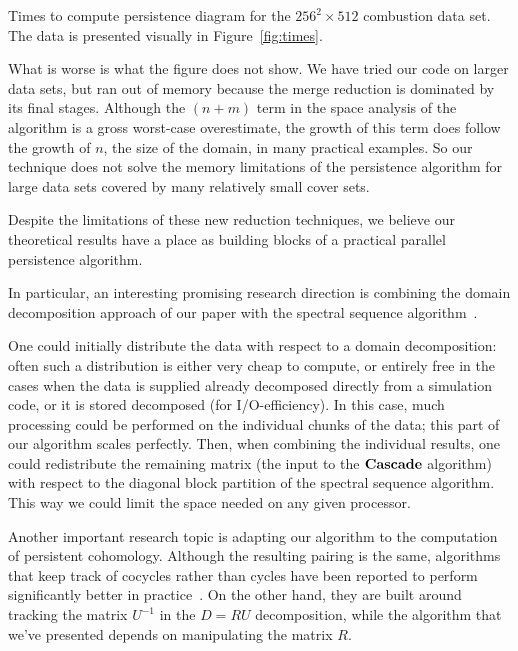 \begin{table}
    \centering
    \pgfplotstabletypeset
    [
        every head row/.style={
            before row={
                \toprule
            },
            after row=\midrule,
        },
        columns={proc, time},
        columns/proc/.style         ={column name=processors, int detect, column type={r}},
        columns/time/.style         ={column name=seconds, fixed, column type={|r}},
    ]
    {\pltCombustionMed}
    \caption{Times to compute persistence diagram for the $256^2 \times 512$
             combustion data set. The data is presented visually in
             Figure~\ref{fig:times}.}
    \label{tbl:times}
\end{table}

What is worse is what the figure does not show. We have tried our code on larger
data sets, but ran out of memory because the merge reduction is dominated by its
final stages. Although the $(n+m)$ term in the space analysis of the
 algorithm is a gross worst-case overestimate, the growth of this
term does follow the growth of $n$, the size of the domain, in many practical
examples. So our technique does not solve the memory limitations of the
persistence algorithm for large data sets covered by many relatively small cover sets.

Despite the limitations of these new reduction techniques, we believe our theoretical
results have a place as building blocks of a practical parallel persistence algorithm.

In particular, an interesting promising research direction is
combining the domain decomposition approach of our paper with the spectral sequence
algorithm~\cite{EH-book,dipha}.

One could initially distribute the data with respect to a domain decomposition:
often such a distribution is either very cheap to compute, or entirely
free in the cases when the data is supplied already decomposed directly from a simulation code,
or it is stored decomposed (for I/O-efficiency). In this case, much processing
could be performed on the individual chunks of the data; this part of our
algorithm scales perfectly. Then, when combining the individual results, one
could redistribute the remaining matrix (the input to the ${\bf Cascade}$
algorithm) with respect to the diagonal block partition of the spectral sequence
algorithm. This way we could limit the space needed on any given processor.

Another important research topic is adapting our algorithm to the computation of
persistent cohomology. Although the resulting pairing is the same, algorithms
that keep track of cocycles rather than cycles have been reported to perform
significantly better in practice~\cite{dualities,compressed-annotation-matrix}.
On the other hand, they are built around tracking the matrix $U^{-1}$ in the $D=RU$
decomposition, while the algorithm that we've presented depends on manipulating
the matrix $R$.

